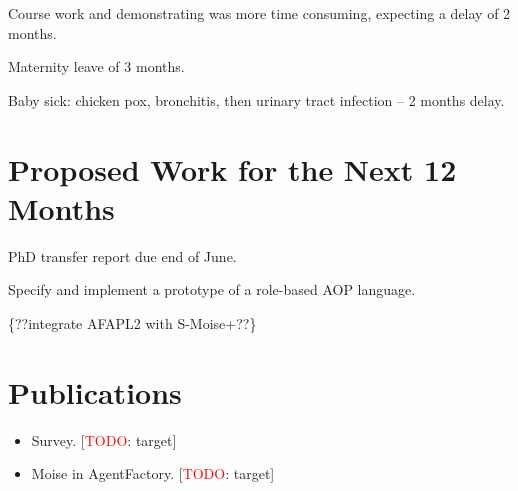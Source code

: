 \documentclass{article}
\newcommand{\todo}[1]{[\textcolor{red}{TODO}: #1]}
\begin{document}
Course work and demonstrating was more time consuming, expecting a delay of 2
months.

Maternity leave of 3 months. 

Baby sick: chicken pox, bronchitis, then urinary tract infection -- 2 months
delay.

\section{Proposed Work for the Next 12 Months}

PhD transfer report due end of June.

Specify and implement a prototype of a role-based AOP language.

\{??integrate AFAPL2 with S-Moise+??\}

\section{Publications}

\begin{itemize}
\item Survey. \todo{target}
\item Moise in AgentFactory. \todo{target}
\end{itemize}
\end{document}
